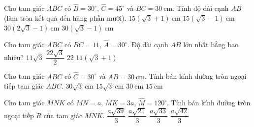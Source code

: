 	\begin{ex}%
		Cho tam giác $ABC$ có $\widehat{B}= 30^\circ$, $\widehat{C}=45^\circ$ và $BC = 30\mathrm{~cm}$. Tính độ dài cạnh $AB$ (làm tròn kết quả đến hàng phần mười).
		\choice
		{$15 (\sqrt{3}+1) \mathrm{~cm}$}
		{$15 (\sqrt{3}-1) \mathrm{~cm}$}
		{$30 (2\sqrt{3}-1) \mathrm{~cm}$}
		{\True $30 (\sqrt{3}-1) \mathrm{~cm}$}
	\end{ex}
	
	
	\begin{ex}%
		Cho tam giác $ABC$ có $BC= 11$, $\widehat{A} = 30^\circ$. Độ dài  cạnh $AB$ lớn nhất bằng bao nhiêu?
		\choice
		{$11\sqrt{3}$}
		{$\dfrac{22\sqrt{3}}{2}$}
		{\True $22$}
		{$11 (\sqrt{3}+1)$}
	\end{ex}
	
	\begin{ex}%
		Cho tam giác $ABC$ có $\widehat{C}= 30^\circ$ và $AB= 30 \mathrm{~cm}$. Tính bán kính đường tròn ngoại tiếp tam giác $ABC$.
		\choice
		{$30\sqrt{3} \mathrm{~cm}$}
		{$15 \sqrt{3}\mathrm{~cm}$}
		{\True $30 \mathrm{~cm}$}
		{$15 \mathrm{~cm}$}
	\end{ex}
	
	\begin{ex}%
		Cho tam giác $MNK$ có $MN = a$, $MK=3a$, $\widehat{M} = 120^\circ$.  Tính bán kính đường tròn ngoại tiếp $R$ của tam giác $MNK$.
		\choice
		{\True $\dfrac{a\sqrt{39}}{3}$}
		{$\dfrac{a\sqrt{21}}{3}$}
		{$\dfrac{a\sqrt{33}}{3}$}
		{$\dfrac{a\sqrt{42}}{3}$}
	\end{ex}
	
